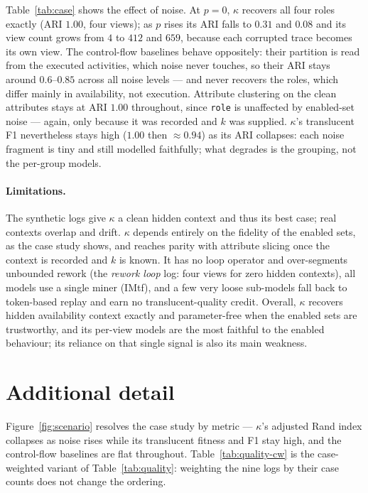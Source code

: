 \documentclass[10pt]{article}
\begin{document}
\begin{table}[t]
  \centering
  \caption{Service-desk case study: ARI and translucent F1 for every approach at each enabled-set noise level $p$ (mean over three seeds); the best value in each column is in \textbf{bold}.}
  \label{tab:case}
  \scriptsize\setlength{\tabcolsep}{3pt}
  \resizebox{\linewidth}{!}{}
\end{table}

Table~\ref{tab:case} shows the effect of noise.
At $p=0$, $\kappa$ recovers all four roles exactly (ARI $1.00$, four views); as $p$ rises its ARI falls to $0.31$ and $0.08$ and its view count grows from $4$ to $412$ and $659$, because each corrupted trace becomes its own view.
The control-flow baselines behave oppositely: their partition is read from the executed activities, which noise never touches, so their ARI stays around $0.6$--$0.85$ across all noise levels --- and never recovers the roles, which differ mainly in availability, not execution.
Attribute clustering on the clean attributes stays at ARI $1.00$ throughout, since \texttt{role} is unaffected by enabled-set noise --- again, only because it was recorded and $k$ was supplied.
$\kappa$'s translucent F1 nevertheless stays high ($1.00$ then ${\approx}0.94$) as its ARI collapses: each noise fragment is tiny and still modelled faithfully; what degrades is the grouping, not the per-group models.

\paragraph{Limitations.}
The synthetic logs give $\kappa$ a clean hidden context and thus its best case; real contexts overlap and drift.
$\kappa$ depends entirely on the fidelity of the enabled sets, as the case study shows, and reaches parity with attribute slicing once the context is recorded and $k$ is known.
It has no loop operator and over-segments unbounded rework (the \emph{rework loop} log: four views for zero hidden contexts), all models use a single miner (IMtf), and a few very loose sub-models fall back to token-based replay and earn no translucent-quality credit.
Overall, $\kappa$ recovers hidden availability context exactly and parameter-free when the enabled sets are trustworthy, and its per-view models are the most faithful to the enabled behaviour; its reliance on that single signal is also its main weakness.

\appendix
\section{Additional detail}
\label{sec:appendix}
Figure~\ref{fig:scenario} resolves the case study by metric --- $\kappa$'s adjusted Rand index collapses as noise rises while its translucent fitness and F1 stay high, and the control-flow baselines are flat throughout.
Table~\ref{tab:quality-cw} is the case-weighted variant of Table~\ref{tab:quality}: weighting the nine logs by their case counts does not change the ordering.
\end{document}

